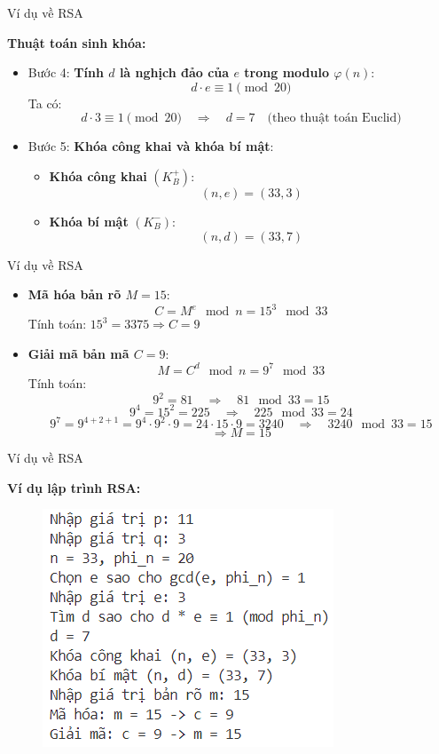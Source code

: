 \documentclass{beamer}
\numberwithin{equation}{section}
\begin{document}
\begin{frame}{Ví dụ về RSA}

\textbf{Thuật toán sinh khóa:}

\begin{itemize}

\item Bước 4: \textbf{Tính $d$ là nghịch đảo của $e$ trong modulo $\varphi(n)$}:
\[
d \cdot e \equiv 1 \pmod{20}
\]
Ta có:
\[
d \cdot 3 \equiv 1 \pmod{20} \quad \Rightarrow \quad d = 7 \quad \text{(theo thuật toán Euclid)}
\]

\item Bước 5: \textbf{Khóa công khai và khóa bí mật}:
\begin{itemize}
\item \textbf{Khóa công khai} $(K_B^+)$:
\[
(n, e) = (33, 3)
\]
\item \textbf{Khóa bí mật} $(K_B^-)$:
\[
(n, d) = (33, 7)
\]
\end{itemize}
\end{itemize}
\end{frame}
\begin{frame}{Ví dụ về RSA}

\begin{itemize}

\item \textbf{Mã hóa bản rõ $M = 15$}:
\[
C = M^e \mod n = 15^3 \mod 33
\]
Tính toán:
$15^3 = 3375 \Rightarrow C = 9$

\item \textbf{Giải mã bản mã $C = 9$}:
\[
M = C^d \mod n = 9^7 \mod 33
\]
Tính toán:
\[
9^2 = 81 \quad \Rightarrow \quad 81 \mod 33 = 15
\]
\[
9^4 = 15^2 = 225 \quad \Rightarrow \quad 225 \mod 33 = 24
\]
\[
9^7 = 9^{4+2+1} = 9^4 \cdot 9^2 \cdot 9 = 24 \cdot 15 \cdot 9 = 3240 \quad \Rightarrow \quad 3240 \mod 33 = 15
\]
\[
\Rightarrow M = 15
\]

\end{itemize}
\end{frame}
\begin{frame}{Ví dụ về RSA}

\textbf{Ví dụ lập trình RSA:}

\begin{figure}[H]
\centering
\includegraphics[scale = 0.9]{pictures/lap_trinh_vi_du_RSA.png}
\end{figure}

\end{frame}
\end{document}
